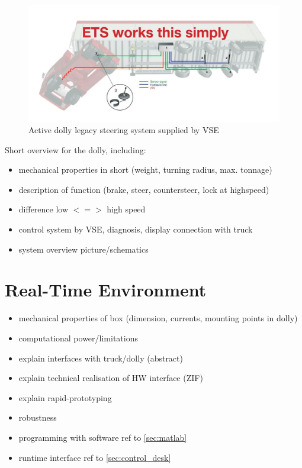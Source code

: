 \documentclass[ExampleMasters.tex]{subfiles}
\begin{document}
\begin{figure}[h]
\centering
\includegraphics[width=1.0\linewidth]{figures/legacy_system_vse}
\caption[]{Active dolly legacy steering system supplied by VSE\cite{dolly_datasheet}}
\label{fig:legacy_system_vse}
\end{figure}





Short overview for the dolly, including: 

\begin{itemize}
\item mechanical properties in short (weight, turning radius, max. tonnage)
\item description of function (brake, steer, countersteer, lock at highspeed)
\item difference low $<=>$ high speed
\item control system by VSE, diagnosis, display connection with truck
\item system overview picture/schematics

\end{itemize}
\section{Real-Time Environment}
\label{sec:realtime_environment}



\begin{itemize}
	\item mechanical properties of box  (dimension, currents, mounting points in dolly)
	\item computational power/limitations
	\item explain interfaces with truck/dolly (abstract)
	\item explain technical realisation of HW interface (ZIF)
	\item explain rapid-prototyping
	\item robustness
	\item programming with software ref to \ref{sec:matlab}
	\item runtime interface ref to \ref{sec:control_desk}
\end{itemize}
\end{document}
